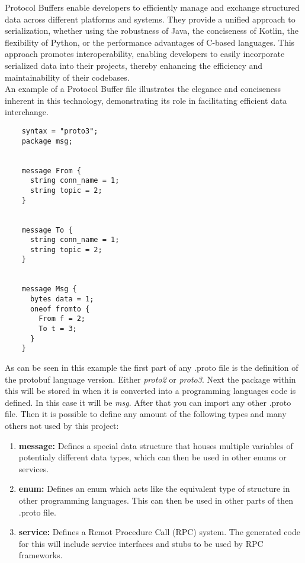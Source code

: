 Protocol Buffers enable developers to efficiently manage and exchange structured data across different platforms and systems. They provide a unified approach 
to serialization, whether using the robustness of Java, the conciseness of Kotlin, the flexibility of Python, or the performance advantages of C-based languages. 
This approach promotes interoperability, enabling developers to easily incorporate serialized data into their projects, thereby enhancing the efficiency and 
maintainability of their codebases.\\

An example of a Protocol Buffer file illustrates the elegance and conciseness inherent in this technology, demonstrating its role in facilitating efficient 
data interchange.

\begin{verbatim}
    syntax = "proto3";
    package msg;
    
    
    message From {
      string conn_name = 1;
      string topic = 2;
    }
    
    
    message To {
      string conn_name = 1;
      string topic = 2;
    }
    
    
    message Msg {
      bytes data = 1;
      oneof fromto {
        From f = 2;
        To t = 3;
      }
    }
\end{verbatim}

As can be seen in this example the first part of any .proto file is the definition of the protobuf language version. Either \textit{proto2} or \textit{proto3}. Next the package within this will be 
stored in when it is converted into a programming languages code is defined. In this case it will be \textit{msg}. After that you can import any other .proto file.
Then it is possible to define any amount of the following types and many others not used by this project:
\begin{enumerate}
    \item \textbf{message:} Defines a special data structure that houses multiple variables of potentialy different data types, which can then be used in other enums or services.
    \item \textbf{enum:} Defines an enum which acts like the equivalent type of structure in other programming languages. This can then be used in other parts of then .proto file.
    \item \textbf{service:} Defines a Remot Procedure Call (RPC) system. The generated code for this will include service interfaces and stubs to be used by RPC frameworks.
\end{enumerate}

